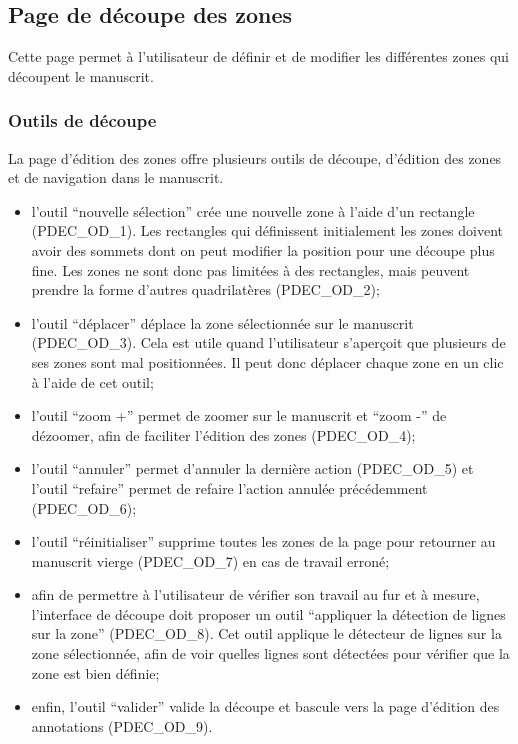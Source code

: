 \subsection{Page de découpe des zones}

Cette page permet à l’utilisateur de définir et de modifier les différentes zones qui découpent le manuscrit.

\subsubsection{Outils de découpe}

La page d’édition des zones offre plusieurs outils de découpe, d’édition des zones et de navigation dans le manuscrit.
\begin{itemize}
	\item l’outil “nouvelle sélection” crée une nouvelle zone à l’aide d’un rectangle (PDEC_OD_1). Les rectangles qui définissent initialement les zones doivent avoir des sommets dont on peut modifier la position pour une découpe plus fine. Les zones ne sont donc pas limitées à des rectangles, mais peuvent prendre la forme d’autres quadrilatères (PDEC_OD_2);
	\item l’outil “déplacer” déplace la zone sélectionnée sur le manuscrit (PDEC_OD_3). Cela est utile quand l’utilisateur s’aperçoit que plusieurs de ses zones sont mal positionnées. Il peut donc déplacer chaque zone en un clic à l’aide de cet outil;
	\item l’outil “zoom +” permet de zoomer sur le manuscrit et “zoom -” de dézoomer, afin de faciliter l’édition des zones (PDEC_OD_4);
	\item l’outil “annuler” permet d’annuler la dernière action (PDEC_OD_5) et l’outil “refaire” permet de refaire l’action annulée précédemment (PDEC_OD_6);
	\item l’outil “réinitialiser” supprime toutes les zones de la page pour retourner au manuscrit vierge (PDEC_OD_7) en cas de travail erroné;
	\item afin de permettre à l’utilisateur de vérifier son travail au fur et à mesure, l’interface de découpe doit proposer un outil “appliquer la détection de lignes sur la zone” (PDEC_OD_8). Cet outil applique le détecteur de lignes sur la zone sélectionnée, afin de voir quelles lignes sont détectées pour vérifier que la zone est bien définie;
	\item enfin, l’outil “valider” valide la découpe et bascule vers la page d’édition des annotations (PDEC_OD_9).
\end{itemize}

